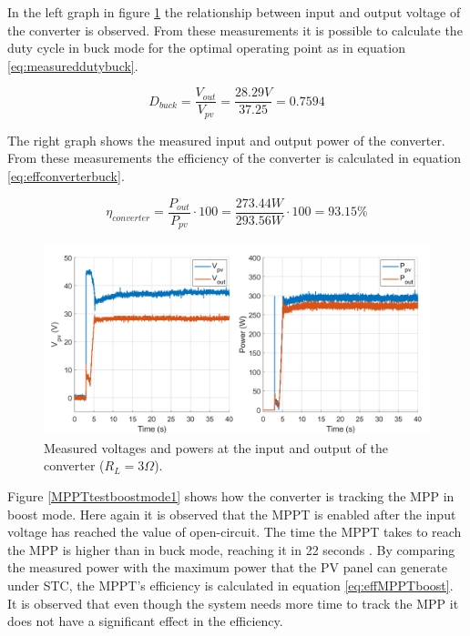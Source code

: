 In the left graph in figure \ref{MPPTtestbuckmode2} the relationship between input and output voltage of the converter is observed. From these measurements it is possible to calculate the duty cycle in buck mode for the optimal operating point as in equation \ref{eq:measureddutybuck}. 

\begin{equation} \label{eq:measureddutybuck}
D_{buck}= \dfrac{V_{out}}{V_{pv}} = \dfrac{28.29V}{37.25} = 0.7594
\end{equation}

The right graph shows the measured input and output power of the converter. From these measurements the efficiency of the converter is calculated in equation \ref{eq:effconverterbuck}.

\begin{equation} \label{eq:effconverterbuck}
\eta_{converter}= \dfrac{P_{out}}{P_{pv}} \cdot 100 = \dfrac{273.44W}{293.56W} \cdot 100 = 93.15\% 
\end{equation}


\begin{figure}[H]
	\begin{center}
		\includegraphics[width=1\textwidth]{../Pictures/P1/Test/Buck_mode_MPPT_Vin_Vout_Pin_Pout}
		\caption{Measured voltages and powers at the input and output of the converter ($R_{L}=3\Omega$).}
		\label{MPPTtestbuckmode2}
	\end{center}	
\end{figure}

Figure \ref{MPPTtestboostmode1} shows how the converter is tracking the MPP in boost mode. Here again it is observed that the MPPT is enabled after the input voltage has reached the value of open-circuit. The time the MPPT takes to reach the MPP is higher than in buck mode, reaching it in 22 seconds . By comparing the measured power with the maximum power that the PV panel can generate under STC, the MPPT's efficiency is calculated in equation \ref{eq:effMPPTboost}. It is observed that even though the system needs more time to track the MPP it does not have a significant effect in the efficiency.

